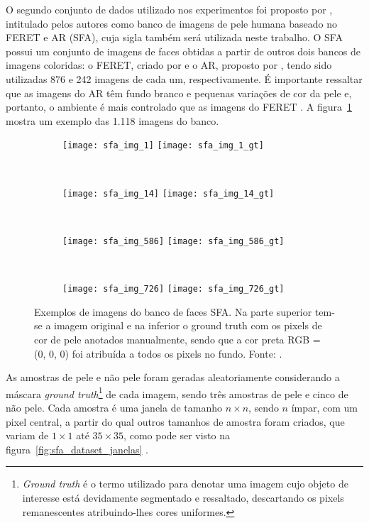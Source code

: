 O segundo conjunto de dados utilizado nos experimentos foi proposto por \citet{sfa-skin-dataset:13}, intitulado pelos autores como banco de imagens de pele humana baseado no FERET e AR (SFA), cuja sigla também será utilizada neste trabalho. O SFA possui um conjunto de imagens de faces obtidas a partir de outros dois bancos de imagens coloridas: o FERET, criado por \citet{feret:96} e o AR, proposto por \citet{ar-face-database:98}, tendo sido utilizadas 876 e 242 imagens de cada um, respectivamente. É importante ressaltar que as imagens do AR têm fundo branco e pequenas variações de cor da pele e, portanto, o ambiente é mais controlado que as imagens do FERET \citep{sfa-skin-dataset:13}. A figura~\ref{fig:sfa_dataset_exemplo} mostra um exemplo das 1.118 imagens do banco.

\begin{figure}[h]
    \centering
    \begin{subfigure}[t]{0.21\textwidth}
        \texttt{[image: sfa\_img\_1]}
        \texttt{[image: sfa\_img\_1\_gt]}
    \end{subfigure}
    ~
    \begin{subfigure}[t]{0.21\textwidth}
        \texttt{[image: sfa\_img\_14]}
        \texttt{[image: sfa\_img\_14\_gt]}
    \end{subfigure}
    ~
    \begin{subfigure}[t]{0.21\textwidth}
        \texttt{[image: sfa\_img\_586]}
        \texttt{[image: sfa\_img\_586\_gt]}
    \end{subfigure}
    ~ %
    \begin{subfigure}[t]{0.21\textwidth}
        \texttt{[image: sfa\_img\_726]}
        \texttt{[image: sfa\_img\_726\_gt]}
    \end{subfigure}
    \caption[Exemplos de imagens do banco de faces SFA]{Exemplos de imagens do banco de faces SFA. Na parte superior tem-se a imagem original e na inferior o ground truth com os pixels de cor de pele anotados manualmente, sendo que a cor preta RGB = (0, 0, 0) foi atribuída a todos os pixels no fundo. Fonte: \citet{sfa-skin-dataset:13}.}
    \label{fig:sfa_dataset_exemplo}
\end{figure}

As amostras de pele e não pele foram geradas aleatoriamente considerando a máscara \emph{ground truth}\footnote{\emph{Ground truth} é o termo utilizado para denotar uma imagem cujo objeto de interesse está devidamente segmentado e ressaltado, descartando os pixels remanescentes atribuindo-lhes cores uniformes.} de cada imagem, sendo três amostras de pele e cinco de não pele. Cada amostra é uma janela de tamanho $n\times n$, sendo $n$ ímpar, com um pixel central, a partir do qual outros tamanhos de amostra foram criados, que variam de $1 \times 1$ até $35 \times 35$, como pode ser visto na figura~\ref{fig:sfa_dataset_janelas} \citep{sfa-skin-dataset:13}.

